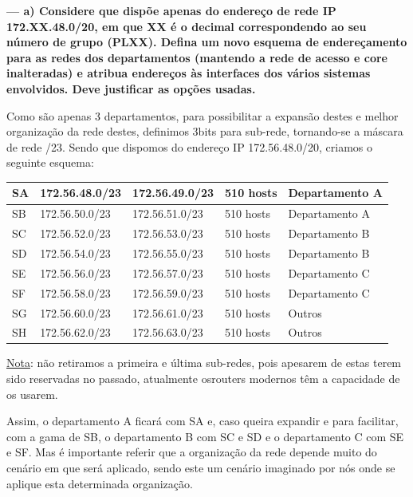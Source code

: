 \documentclass[a4paper]{article}
\begin{document}
\vspace{1cm}

\textbf{--- a) Considere que dispõe apenas do endereço de rede IP 172.XX.48.0/20, em que XX é o decimal correspondendo ao seu número de grupo (PLXX). Defina um novo esquema de endereçamento para as redes dos departamentos (mantendo a rede de acesso e core inalteradas) e atribua endereços às interfaces dos vários sistemas envolvidos. Deve justificar as opções usadas.}\newline

Como são apenas 3 departamentos, para possibilitar a expansão destes e melhor organização da rede destes, definimos 3bits para sub-rede, tornando-se a máscara de rede /23.
Sendo que dispomos do endereço IP 172.56.48.0/20, criamos o seguinte esquema:

\begin{table}[h]
\begin{tabular}{|l|l|l|l|l|}
\hline
SA & 172.56.48.0/23 & 172.56.49.0/23 & 510 hosts & Departamento A \\ \hline
SB & 172.56.50.0/23 & 172.56.51.0/23 & 510 hosts & Departamento A \\ \hline
SC & 172.56.52.0/23 & 172.56.53.0/23 & 510 hosts & Departamento B \\ \hline
SD & 172.56.54.0/23 & 172.56.55.0/23 & 510 hosts & Departamento B \\ \hline
SE & 172.56.56.0/23 & 172.56.57.0/23 & 510 hosts & Departamento C \\ \hline
SF & 172.56.58.0/23 & 172.56.59.0/23 & 510 hosts & Departamento C \\ \hline
SG & 172.56.60.0/23 & 172.56.61.0/23 & 510 hosts & Outros            \\ \hline
SH & 172.56.62.0/23 & 172.56.63.0/23 & 510 hosts & Outros            \\ \hline
\end{tabular}
\end{table}

\underline{Nota}: não retiramos a primeira e última sub-redes, pois apesarem de estas terem sido reservadas no passado, atualmente osrouters modernos têm a capacidade de os usarem.

Assim, o departamento A ficará com SA e, caso queira expandir e para facilitar, com a gama de SB, o departamento B com SC e SD e o departamento C com SE e SF.\newline
Mas é importante referir que a organização da rede depende muito do cenário em que será aplicado, sendo este um cenário imaginado por nós onde se aplique esta determinada organização.
\end{document}
